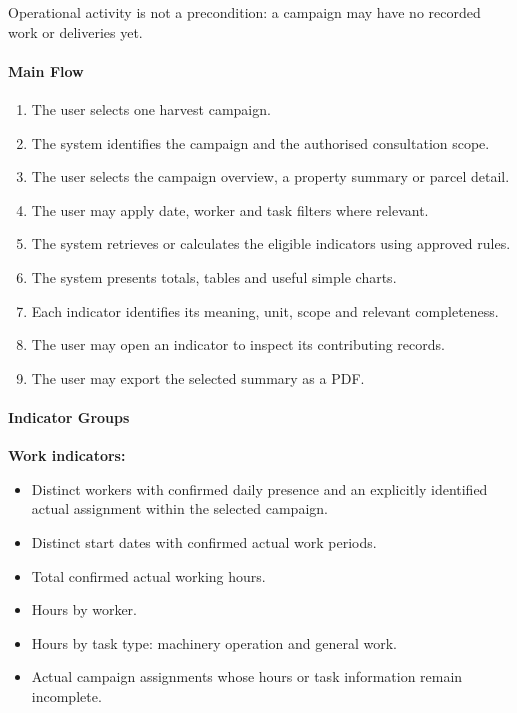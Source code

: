 Operational activity is not a precondition:
a campaign may have no recorded work
or deliveries yet.

\paragraph{Main Flow}

\begin{enumerate}
    \item The user selects one harvest campaign.
    \item The system identifies the campaign
    and the authorised consultation scope.
    \item The user selects the campaign overview,
    a property summary or parcel detail.
    \item The user may apply date, worker
    and task filters where relevant.
    \item The system retrieves or calculates
    the eligible indicators using approved rules.
    \item The system presents totals, tables
    and useful simple charts.
    \item Each indicator identifies its meaning,
    unit, scope and relevant completeness.
    \item The user may open an indicator
    to inspect its contributing records.
    \item The user may export the selected
    summary as a PDF.
\end{enumerate}

\paragraph{Indicator Groups}

\textbf{Work indicators:}
\begin{itemize}
    \item Distinct workers with confirmed
    daily presence and an explicitly identified
    actual assignment within the selected campaign.
    \item Distinct start dates with confirmed
    actual work periods.
    \item Total confirmed actual working hours.
    \item Hours by worker.
    \item Hours by task type:
    machinery operation and general work.
    \item Actual campaign assignments whose
    hours or task information remain incomplete.
\end{itemize}

